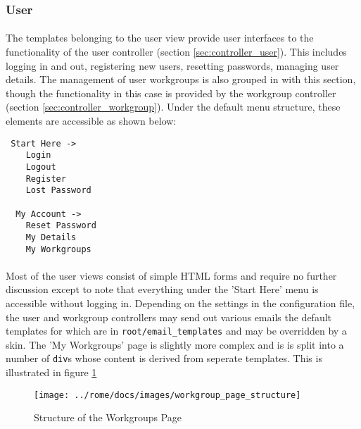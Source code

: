 \subsubsection{User}
\label{sec:view_user}

\paragraph{}
The templates belonging to the user view provide user interfaces to the functionality of the user controller (section \ref{sec:controller_user}). This includes logging in and out, registering new users, resetting passwords, managing user details. The management of user workgroups is also grouped in with this section, though the functionality in this case is provided by the workgroup controller (section \ref{sec:controller_workgroup}). Under the default menu structure, these elements are accessible as shown below:

\begin{scriptsize}
\begin{verbatim}
 Start Here ->
    Login
    Logout
    Register
    Lost Password

  My Account ->
    Reset Password
    My Details
    My Workgroups

\end{verbatim}
\end{scriptsize}
\paragraph{}
Most of the user views consist of simple HTML forms and require no further discussion except to note that everything under the 'Start Here' menu is accessible without logging in. Depending on the settings in the configuration file, the user and workgroup controllers may send out various emails the default templates for which are in \texttt{root/email\_templates} and may be overridden by a skin. The 'My Workgroups' page is slightly more complex and is is split into a number of \texttt{div}s whose content is derived from seperate templates. This is illustrated in figure \ref{fig:workgroups_main}

\begin{figure}[h]
\centering
\texttt{[image: ../rome/docs/images/workgroup\_page\_structure]}
\caption{Structure of the Workgroups Page}\label{fig:workgroups_main}
\end{figure}

